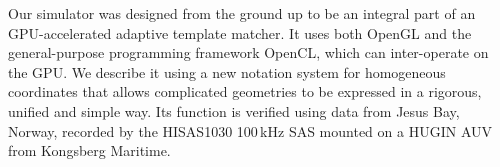 




Our simulator was designed from the ground up to be an integral part of an GPU-accelerated adaptive template matcher. It uses both OpenGL and the general-purpose programming framework OpenCL, which can inter-operate on the GPU. We describe it using a new notation system for homogeneous coordinates that allows complicated geometries to be expressed in a rigorous, unified and simple way. Its function is verified using data from Jesus Bay, Norway, recorded by the HISAS1030 100\,kHz SAS  mounted on a HUGIN AUV from Kongsberg Maritime.

%
%









